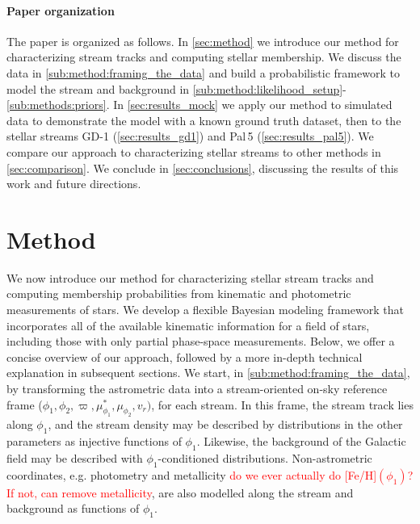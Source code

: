 \documentclass[twocolumn]{aastex631}
\newcommand{\stream}[1]{#1}
\newcommand{\parallax}{\varpi}
\newcommand{\TODO}[1]{{\textcolor{red}{#1}}}
\newcommand{\JN}[1]{\TODO{#1}}
\begin{document}
    \paragraph{Paper organization}

        The paper is organized as follows.  In \autoref{sec:method} we introduce
        our method for characterizing stream tracks and computing stellar
        membership.  We discuss the data in
        \autoref{sub:method:framing_the_data} and build a probabilistic
        framework to model the stream and background in
        \autoref{sub:method:likelihood_setup}-\autoref{sub:methods:priors}.  In
        \autoref{sec:results_mock} we apply our method to simulated data to
        demonstrate the model with a known ground truth dataset, then to the
        stellar streams \stream{GD-1} (\autoref{sec:results_gd1}) and
        \stream{Pal\,5} (\autoref{sec:results_pal5}).  We compare our approach
        to characterizing stellar streams to other methods in
        \autoref{sec:comparison}.  We conclude in \autoref{sec:conclusions},
        discussing the results of this work and future directions.


\section{Method} \label{sec:method}

    We now introduce our method for characterizing stellar stream tracks and
    computing membership probabilities from kinematic and photometric measurements of stars. 
    We develop a flexible Bayesian modeling framework that incorporates all of the available kinematic information for a field of stars, including those with only partial phase-space measurements. Below, we offer a concise
    overview of our approach, followed by a more in-depth technical explanation
    in subsequent sections.  We start, in \autoref{sub:method:framing_the_data},
    by transforming the astrometric data into a stream-oriented on-sky reference
    frame ($\phi_1, \phi_2, \parallax, \mu_{\phi_1}^*, \mu_{\phi_2}, v_r)$, for
    each stream. In this frame, the stream track lies along $\phi_1$, and the
    stream density may be described by distributions in the other parameters as
    injective functions of $\phi_1$.
    Likewise, the background of the Galactic field may be described with
    $\phi_1$-conditioned distributions.
    Non-astrometric coordinates, e.g. photometry and metallicity \JN{do we ever actually do [Fe/H]$(\phi_1)$? If not, can remove metallicity}, are also
    modelled along the stream and background as functions of $\phi_1$.
\end{document}
